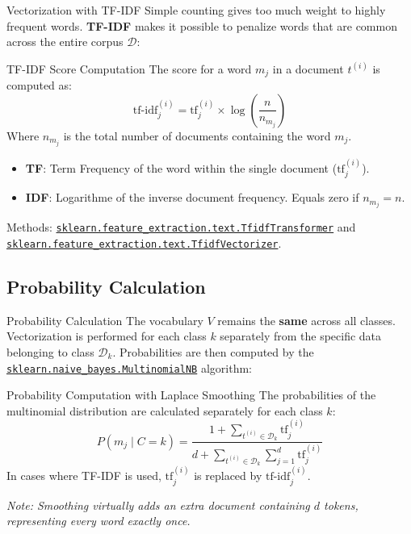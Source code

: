 \begin{frame}{Vectorization with TF-IDF}
	Simple counting gives too much weight to highly frequent words. \textbf{TF-IDF} makes it possible to penalize words that are common across the entire corpus $\mathcal{D}$:
	\begin{block}{TF-IDF Score Computation}
		The score for a word $m_j$ in a document $t^{(i)}$ is computed as:
		\begin{equation}
			\text{tf-idf}_j^{(i)} = \text{tf}_j^{(i)} \times \log\left( \frac{n}{n_{m_j}} \right)
			\nonumber
		\end{equation}
		Where $n_{m_j}$ is the total number of documents containing the word $m_j$.
	\end{block}
	\begin{itemize}
		\item \textbf{TF}: Term Frequency of the word within the single document ($\text{tf}^{(i)}_j$).
		\item \textbf{IDF}: Logarithme of the inverse document frequency. Equals zero if $n_{m_j} = n$.
	\end{itemize}
	\vfill
	Methods: \href{https://scikit-learn.org/stable/modules/generated/sklearn.feature_extraction.text.TfidfTransformer.html}{\texttt{sklearn.feature\_extraction.text.TfidfTransformer}} and \href{https://scikit-learn.org/stable/modules/generated/sklearn.feature_extraction.text.TfidfVectorizer.html}{\texttt{sklearn.feature\_extraction.text.TfidfVectorizer}}.
\end{frame}

\subsection[Probability Calculation]{Probability Calculation}

\begin{frame}{Probability Calculation}
	The vocabulary $V$ remains the \textbf{same} across all classes. Vectorization is performed for each class $k$ separately from the specific data belonging to class $\mathcal{D}_k$. Probabilities are then computed by the \href{https://scikit-learn.org/stable/modules/generated/sklearn.naive_bayes.MultinomialNB.html}{\texttt{sklearn.naive\_bayes.MultinomialNB}} algorithm:
	\begin{block}{Probability Computation with Laplace Smoothing}
		The probabilities of the multinomial distribution are calculated separately for each class $k$:
		\begin{equation}
			P(m_j \mid C = k) = \frac{1 + \underset{t^{(i)} \in \mathcal{D}_k}{\sum} \text{tf}^{(i)}_j}{d + \underset{t^{(i)} \in \mathcal{D}_k}{\sum} \sum_{j=1}^d \text{tf}^{(i)}_j}
			\nonumber
		\end{equation}
		In cases where TF-IDF is used, $\text{tf}^{(i)}_j$ is replaced by $\text{tf-idf}^{(i)}_j$.
	\end{block}
	\textit{Note: Smoothing virtually adds an extra document containing $d$ tokens, representing every word exactly once.}
\end{frame}